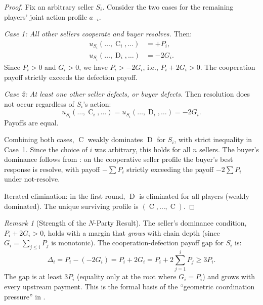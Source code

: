 \documentclass[11pt,a4paper]{article}
\theoremstyle{definition}
\theoremstyle{remark}
\newtheorem{remark}[theorem]{Remark}
\newcommand{\pay}{P}           %
\newcommand{\cumval}{G}        %
\DeclareMathOperator{\Coop}{C}
\DeclareMathOperator{\Def}{D}
\begin{document}
\begin{proof}
Fix an arbitrary seller $S_i$. Consider the two cases for the remaining
players' joint action profile $a_{-i}$.

\emph{Case 1: All other sellers cooperate and buyer resolves.} Then:
\begin{align}
  u_{S_i}(\ldots, \Coop_i, \ldots) &= +\pay_i, \\
  u_{S_i}(\ldots, \Def_i, \ldots) &= -2\cumval_i.
\end{align}
Since $\pay_i > 0$ and $\cumval_i > 0$, we have
$\pay_i > -2\cumval_i$, i.e., $\pay_i + 2\cumval_i > 0$. The
cooperation payoff strictly exceeds the defection payoff.

\emph{Case 2: At least one other seller defects, or buyer defects.}
Then resolution does not occur regardless of $S_i$'s action:
\begin{equation}
  u_{S_i}(\ldots, \Coop_i, \ldots) = u_{S_i}(\ldots, \Def_i, \ldots)
    = -2\cumval_i.
\end{equation}
Payoffs are equal.

Combining both cases, $\Coop$ weakly dominates $\Def$ for $S_i$, with
strict inequality in Case~1. Since the choice of $i$ was arbitrary,
this holds for all $n$ sellers. The buyer's dominance follows from
: on the cooperative seller profile
the buyer's best response is $\text{resolve}$, with payoff
$-\sum \pay_i$ strictly exceeding the payoff $-2\sum \pay_i$ under
$\text{not-resolve}$.

Iterated elimination: in the first round, $\Def$ is eliminated for all
players (weakly dominated). The unique surviving profile is
$(\Coop, \ldots, \Coop)$.
\end{proof}

\begin{remark}[Strength of the $N$-Party Result]
The seller's dominance condition,
$\pay_i + 2\cumval_i > 0$, holds with a margin that \emph{grows}
with chain depth (since $\cumval_i = \sum_{j \leq i} \pay_j$ is
monotonic). The cooperation-defection payoff gap for $S_i$ is:
\begin{equation}
  \Delta_i = \pay_i - (-2\cumval_i) = \pay_i + 2\cumval_i
    = \pay_i + 2\!\sum_{j=1}^{i} \pay_j \geq 3\pay_i.
\end{equation}
The gap is at least $3\pay_i$ (equality only at the root where
$\cumval_i = \pay_i$) and grows with every upstream payment. This
is the formal basis of the ``geometric coordination pressure'' in
.
\end{remark}
\end{document}
